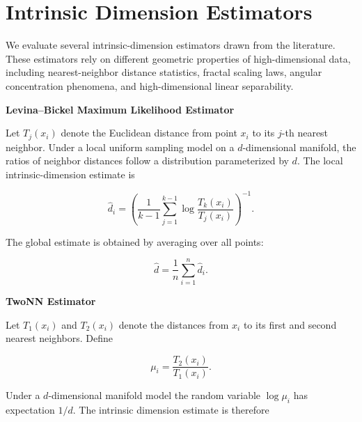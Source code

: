 \documentclass[11pt]{article}
\begin{document}






\section*{Intrinsic Dimension Estimators}

We evaluate several intrinsic-dimension estimators drawn from the literature. 
These estimators rely on different geometric properties of high-dimensional data, including nearest-neighbor distance statistics, fractal scaling laws, angular concentration phenomena, and high-dimensional linear separability.

\textbf{Levina--Bickel Maximum Likelihood Estimator} \cite{levina2005}

Let $T_j(x_i)$ denote the Euclidean distance from point $x_i$ to its $j$-th nearest neighbor. 
Under a local uniform sampling model on a $d$-dimensional manifold, the ratios of neighbor distances follow a distribution parameterized by $d$. 
The local intrinsic-dimension estimate is

\[
\hat d_i =
\left(
\frac{1}{k-1}
\sum_{j=1}^{k-1}
\log \frac{T_k(x_i)}{T_j(x_i)}
\right)^{-1}.
\]

The global estimate is obtained by averaging over all points:

\[
\hat d = \frac{1}{n}\sum_{i=1}^n \hat d_i .
\]

\textbf{TwoNN Estimator} \cite{facco2017}

Let $T_1(x_i)$ and $T_2(x_i)$ denote the distances from $x_i$ to its first and second nearest neighbors. Define

\[
\mu_i = \frac{T_2(x_i)}{T_1(x_i)}.
\]

Under a $d$-dimensional manifold model the random variable $\log \mu_i$ has expectation $1/d$. 
The intrinsic dimension estimate is therefore
\end{document}

